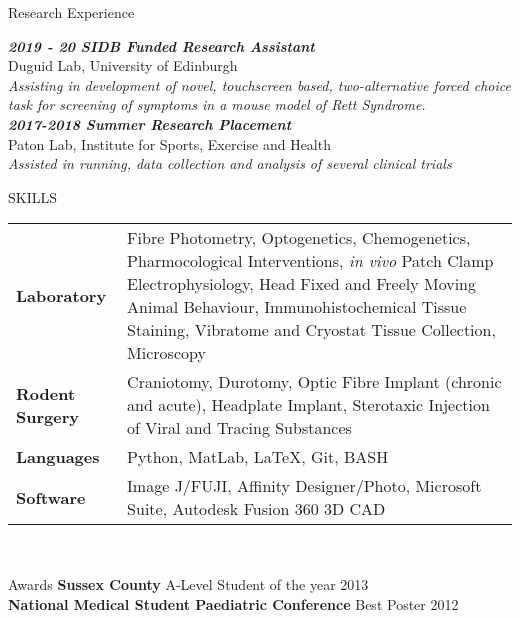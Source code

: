 \documentclass{resume} %
\begin{document}
\begin{rSection}{Research Experience}

{\sl \textbf{2019 - 20 SIDB Funded Research Assistant}}\\
Duguid Lab, University of Edinburgh\\
\emph{Assisting in development of novel, touchscreen based, two-alternative forced choice task for screening of symptoms in a mouse model of Rett Syndrome.}\\

{\sl \textbf{2017-2018 Summer Research Placement}}\\
Paton Lab, Institute for Sports, Exercise and Health\\
\emph{Assisted in running, data collection and analysis of several clinical trials}

\end{rSection}

\newpage

\begin{rSection}{SKILLS}
\renewcommand{\arraystretch}{1.5}
\begin{tabular}{>{\bfseries} p{4cm}  p{15cm}}
Laboratory & Fibre Photometry, Optogenetics, Chemogenetics,  Pharmocological Interventions, \emph{in vivo} Patch Clamp Electrophysiology, Head Fixed and Freely Moving Animal Behaviour, Immunohistochemical Tissue Staining, Vibratome and Cryostat Tissue Collection, Microscopy\\
Rodent Surgery & Craniotomy, Durotomy, Optic Fibre Implant (chronic and acute), Headplate Implant, Sterotaxic Injection of Viral and Tracing Substances\\
Languages & Python, MatLab, LaTeX, Git, BASH \\
Software & Image J/FUJI, Affinity Designer/Photo, Microsoft Suite, Autodesk Fusion 360 3D CAD\\
\end{tabular}\\
\end{rSection}
\begin{rSection}{Awards}
{\textbf{Sussex County} A-Level Student of the year} \hfill{2013}\\
{\textbf{National Medical Student Paediatric Conference} Best Poster} \hfill{2012}

\end{rSection}
\end{document}
